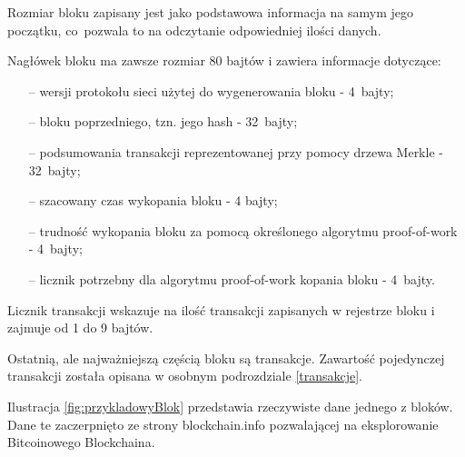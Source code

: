 \documentclass[12pt, twoside, final, openany]{mgr}
\begin{document}
\indent Rozmiar bloku zapisany jest jako podstawowa informacja na samym jego początku, co~pozwala to na odczytanie odpowiedniej ilości danych. 

\indent Nagłówek bloku ma zawsze rozmiar 80 bajtów i zawiera informacje dotyczące:
\begin{itemize}
\item[--] wersji protokołu sieci użytej do wygenerowania bloku - 4~bajty;
\item[--] bloku poprzedniego, tzn. jego hash - 32~bajty;
\item[--] podsumowania transakcji reprezentowanej przy pomocy drzewa Merkle - 32~bajty;
\item[--] szacowany czas wykopania bloku - 4 bajty;
\item[--] trudność wykopania bloku za pomocą określonego algorytmu proof-of-work - 4~bajty;
\item[--] licznik potrzebny dla algorytmu proof-of-work kopania bloku - 4~bajty.
\end{itemize} 

\indent Licznik transakcji wskazuje na ilość transakcji zapisanych w rejestrze bloku i zajmuje od 1 do 9 bajtów.

\indent Ostatnią, ale najważniejszą częścią bloku są transakcje. Zawartość pojedynczej transakcji została opisana w osobnym podrozdziale \ref{transakcje}.

\indent Ilustracja \ref{fig:przykladowyBlok} przedstawia rzeczywiste dane jednego z bloków. Dane te zaczerpnięto ze strony blockchain.info pozwalającej na eksplorowanie Bitcoinowego Blockchaina\cite{blockchaininfo}.
\end{document}
